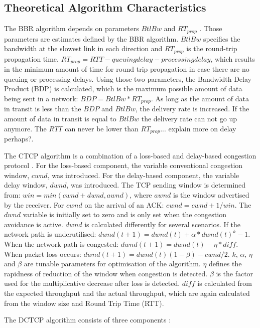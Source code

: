 \documentclass{article}
\begin{document}
\subsection{Theoretical Algorithm Characteristics}\label{sub:algos-theoretical}

The BBR algorithm depends on parameters $BtlBw$ and $RT_{prop}$ \cite{bbr-congestion}. Those parameters are estimates defined by the BBR algorithm. $BtlBw$ specifies the bandwidth at the slowest link in each direction and $RT_{prop}$ is the round-trip propagation time. $RT_{prop} = RTT - queuing delay - processing delay$, which results in the minimum amount of time for round trip propagation in case there are no queuing or processing delays. Using those two parameters, the Bandwidth Delay Product (BDP) is calculated, which is the maximum possible amount of data being sent in a network: $BDP = BtlBw * RT_{prop}$. As long as the amount of data in transit is less than the $BDP$ and $BtlBw$, the delivery rate is increased. If the amount of data in transit is equal to $BtlBw$ the delivery rate can not go up anymore. The $RTT$ can never be lower than $RT_{prop}$... explain more on delay perhaps?.

The CTCP algorithm is a combination of a loss-based and delay-based congestion protocol \cite{compound-tcp-congestion}. For the loss-based component, the variable conventional congestion window, $cwnd$, was introduced. For the delay-based component, the variable delay window, $dwnd$, was introduced. The TCP sending window is determined from: $win = min(cwnd + dwnd, awnd)$, where $awnd$ is the window advertised by the receiver. For $cwnd$ on the arrival of an ACK: $cwnd = cwnd + 1/win$. The $dwnd$ variable is initially set to zero and is only set when the congestion avoidance is active. $dwnd$ is calculated differently for several scenarios. If the network path is underutilised: $dwnd(t+1) = dwnd(t) + \alpha*dwnd(t)^{k} - 1$. When the network path is congested: $dwnd(t+1) = dwnd(t) - \eta*diff$. When packet loss occurs: $dwnd(t+1) = dwnd(t)(1-\beta) - cwnd/2$. $k$, $\alpha$, $\eta$ and $\beta$ are tunable parameters for optimisation of the algorithm. $\eta$ defines the rapidness of reduction of the window when congestion is detected. $\beta$ is the factor used for the multiplicative decrease after loss is detected. $diff$ is calculated from the expected throughput and the actual throughput, which are again calculated from the window size and Round Trip Time (RTT).

The DCTCP algorithm consists of three components \cite{dctcp-congestion-original}:
\end{document}
